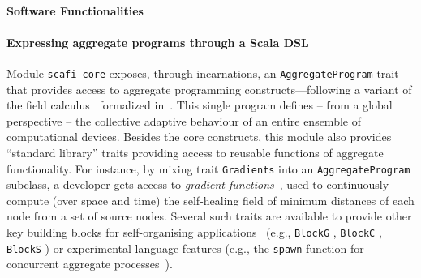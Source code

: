 \paragraph{Software Functionalities}
\label{}

\paragraph*{Expressing aggregate programs through a Scala DSL}
\label{sec:express-programs}
%
Module \texttt{scafi-core}
 exposes,
 through incarnations,
 an \texttt{AggregateProgram} trait
  that provides access to 
  aggregate programming constructs---following 
  a variant of the field calculus~\cite{DBLP:journals/tocl/AudritoVDPB19,DBLP:journals/jlap/ViroliBDACP19}
  formalized in~\cite{DBLP:conf/isola/CasadeiVAD20,arxiv2020scafi-nc}.
%
This single program defines -- from a global perspective -- 
 the collective adaptive behaviour 
 of an entire %
 ensemble of computational devices.
%
Besides the core constructs,
 this module also provides ``standard library'' traits
 providing access to reusable functions of aggregate functionality.
%
For instance, by mixing trait \texttt{Gradients}
 into an \texttt{AggregateProgram} subclass,
 a developer gets access to \emph{gradient functions}~, used to 
 continuously compute (over space and time) the self-healing field of minimum distances of each node from a set of source nodes. %
%
Several such traits are available
 to provide other key building blocks
 for self-organising applications~ (e.g., \texttt{BlockG} , \texttt{BlockC} , \texttt{BlockS} )
 or experimental language features
 (e.g., the \texttt{spawn} function for concurrent aggregate processes~).
%
